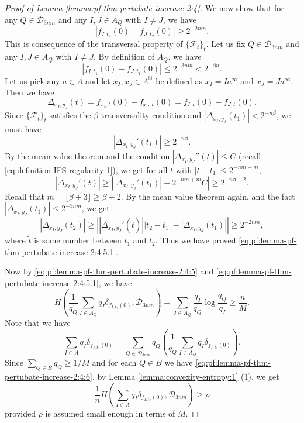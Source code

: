 \documentclass[a4paper,11pt]{amsart}
\theoremstyle{definition}
\numberwithin{equation}{section}
\def\D{\mathcal{D}}
\def\F{\mathcal F}
\def\N{\mathbb N}
\begin{document}
\begin{proof}[Proof of Lemma \ref{lemma:pf-thm-pertubate-increase-2:4}]
We now show that for any $Q\in \D_{3nm}$ and any $I,J\in A_Q$ with $I\neq J$,  we have
\begin{equation}\label{eq:pf:lemma-pf-thm-pertubate-increase-2:4:5.1}
|f_{I,t_2}(0)-f_{J,t_2}(0)|\ge 2^{-2nm}.
\end{equation}
This is consequence of the transversal property of $\{\F_{t}\}_t$.
Let us fix $Q\in \D_{3nm}$ and any $I,J\in A_Q$ with $I\neq J$.  By definition of $A_Q$,  we have
\[
|f_{I,t_1}(0)-f_{J,t_1}(0)|\le 2^{-3nm} < 2^{-\beta n}.
\]
Let us pick any $a\in \Lambda$ and let $x_I,x_J\in \Lambda^\N$ be defined as $x_I=Ia^\infty$ and $x_J=Ja^\infty$.  Then we have
\[
\Delta_{x_I,y_J}(t) = f_{x_I,t}(0)-f_{x_J,t}(0) = f_{I,t}(0)-f_{J,t}(0).
\]
Since $\{\F_t\}_t$ satisfies the $\beta$-transversality condition and $\left|\Delta_{x_I,y_J}(t_1)\right| < 2^{-n\beta}$,   we must have
\[
\left|\Delta_{x_I,y_J}'(t_1)\right| \ge 2^{-n\beta}.
\]
By the mean value theorem and the condition  $\left|\Delta_{x_I,y_J}''(t)\right| \le C$ (recall \eqref{eq:definition-IFS-regularity:1}),  we get for all $t$ with $|t-t_1|\le 2^{-nm+ m}$,
\[
\left|\Delta_{x_I,y_J}'(t)\right|  \ge \left|  \left|\Delta_{x_I,y_J}'(t_1)\right| -2^{-nm+ m}C \right|\ge 2^{-n\beta-2}.
\]
Recall that $m=\lfloor\beta+3\rfloor\ge \beta+2$.
By the mean value theorem again,  and the fact $|\Delta_{x_I,y_J}(t_1)|\le 2^{-3nm}$,  we get
\[
|\Delta_{x_I,y_J}(t_2)| \ge \left| |\Delta_{x_I,y_J}'(\tilde{t})||t_2-t_1| -  |\Delta_{x_I,y_J}(t_1)|  \right| \ge 2^{-2nm},
\]
where $\tilde{t}$ is some number between $t_1$ and $t_2$. Thus we have proved \eqref{eq:pf:lemma-pf-thm-pertubate-increase-2:4:5.1}.

Now by \eqref{eq:pf:lemma-pf-thm-pertubate-increase-2:4:5} and \eqref{eq:pf:lemma-pf-thm-pertubate-increase-2:4:5.1},  we have  
\begin{equation}\label{eq:pf:lemma-pf-thm-pertubate-increase-2:4:6}
H\left(\frac{1}{q_Q}\sum_{I\in A_Q}q_I\delta_{f_{I,t_2}(0)},\D_{3nm}\right)=
\sum_{I\in A_Q}\frac{q_I}{q_Q}\log \frac{q_Q}{q_I} \ge \frac{n}{M}.
\end{equation}
Note that we have
\[
\sum_{I\in A}q_I\delta_{f_{I,t_2}(0)} = \sum_{Q\in \D_{3nm}} q_Q\left(\frac{1}{q_Q}\sum_{I\in A_Q}q_I\delta_{f_{I,t_2}(0)}\right).
\]
Since $\sum_{Q\in B}q_Q\ge 1/M$ and for each $Q\in B$ we have \eqref{eq:pf:lemma-pf-thm-pertubate-increase-2:4:6},  by Lemma \ref{lemma:convexity-entropy:1} (1),  we get
\[
\frac{1}{n}H\left(\sum_{I\in A}q_I\delta_{f_{I,t_2}(0)},\D_{3nm}\right) \ge \rho
\]
provided $\rho$ is assumed small enough in terms of $M$.

\end{proof}
\end{document}
